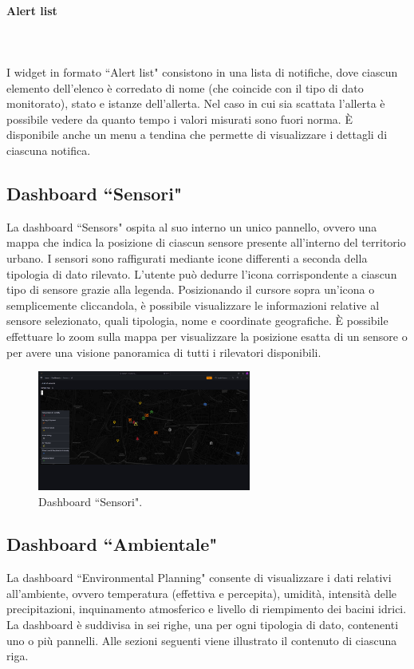 \documentclass[8pt]{article}
\newcommand{\subsubsubsection}[1]{\paragraph{#1}\mbox{}\\\\}
\begin{document}
\subsubsubsection{Alert list}
I widget in formato ``Alert list" consistono in una lista di notifiche, dove ciascun elemento dell'elenco è corredato di nome (che coincide con il tipo di dato monitorato), stato e istanze dell'allerta. Nel caso in cui sia scattata l'allerta è possibile vedere da quanto tempo i valori misurati sono fuori norma. È disponibile anche un menu a tendina che permette di visualizzare i dettagli di ciascuna notifica.

\subsection{Dashboard ``Sensori"}
La dashboard ``Sensors" ospita al suo interno un unico pannello, ovvero una mappa che indica la posizione di ciascun sensore presente all'interno del territorio urbano. I sensori sono raffigurati mediante icone differenti a seconda della tipologia di dato rilevato. L'utente può dedurre l'icona corrispondente a ciascun tipo di sensore grazie alla legenda. Posizionando il cursore sopra un'icona o semplicemente cliccandola, è possibile visualizzare le informazioni relative al sensore selezionato, quali tipologia, nome e coordinate geografiche. È possibile effettuare lo zoom sulla mappa per visualizzare la posizione esatta di un sensore o per avere una visione panoramica di tutti i rilevatori disponibili.
\begin{figure}[H]
    \centering
    \includegraphics[width=7cm]{images_mu/sensors.png}
    \caption{Dashboard ``Sensori".}
    \label{fig:Dashboard ``Sensori"}
\end{figure}
\subsection{Dashboard ``Ambientale"}
La dashboard ``Environmental Planning" consente di visualizzare i dati relativi all'ambiente, ovvero temperatura (effettiva e percepita), umidità, intensità delle precipitazioni, inquinamento atmosferico e livello di riempimento dei bacini idrici. La dashboard è suddivisa in sei righe, una per ogni tipologia di dato, contenenti uno o più pannelli. Alle sezioni seguenti viene illustrato il contenuto di ciascuna riga.
\end{document}
